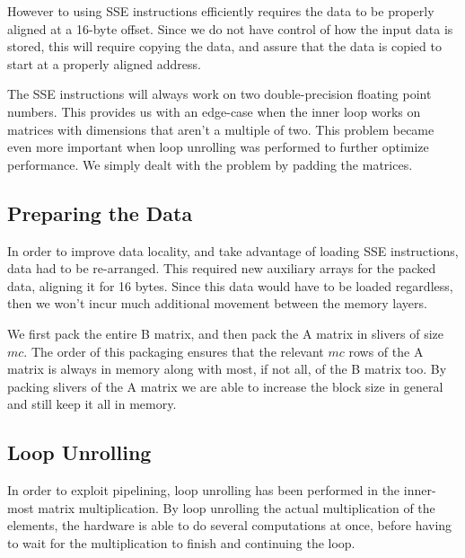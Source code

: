 \documentclass[a4paper,11pt,oneside]{book}
\begin{document}
However to using SSE instructions efficiently requires the data to be properly
aligned at a 16-byte offset.
Since we do not have control of how the input data is stored, this will require 
copying the data, and assure that the data is copied to start at a properly 
aligned address. 

The SSE instructions will always work on two double-precision floating point
numbers. This provides us with an edge-case when the inner loop works on
matrices with dimensions that aren't a multiple of two. This problem became even
more important when loop unrolling was performed to further optimize
performance. We simply dealt with the problem by padding the matrices.


\subsection{Preparing the Data}

In order to improve data locality, and take advantage of loading SSE
instructions, data had to be re-arranged. This required new auxiliary arrays for
the packed data, aligning it for 16 bytes. Since this data would have to be
loaded regardless, then we won't incur much additional movement between the 
memory layers. %

We first pack the entire B matrix, and then pack the A matrix in slivers of size
$mc$. The order of this packaging ensures that the relevant $mc$ rows of the A
matrix is always in memory along with most, if not all, of the B matrix too. By
packing slivers of the A matrix we are able to increase the block size in
general and still keep it all in memory.

\subsection{Loop Unrolling}


In order to exploit pipelining, loop unrolling has been performed in the inner-
most matrix multiplication. By loop unrolling the actual multiplication of the
elements, the hardware is able to do several computations at once, before having
to wait for the multiplication to finish and continuing the loop.
\end{document}
